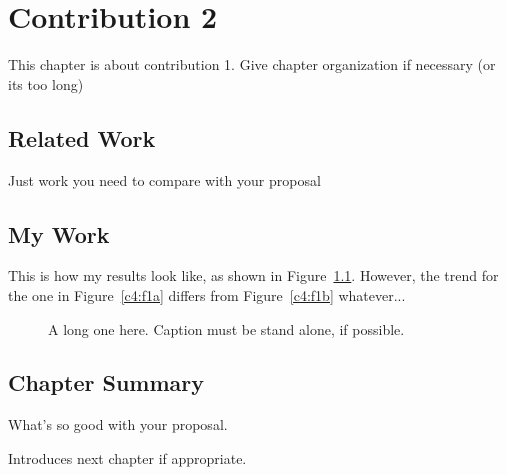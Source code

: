 \chapter{Contribution 2}\label{c4}%
This chapter is about contribution 1. Give chapter organization if
necessary (or its too long)

\section{Related Work}\label{c4:s1}
Just work you need to compare with your proposal

\section{My Work}\label{c4:s2}
This is how my results look like, as shown in Figure~\ref{c4:f1}.
However, the trend for the one in Figure~\ref{c4:f1a} differs from
Figure~\ref{c4:f1b} whatever...

\begin{figure}[!h]
    \centering
    \hfil
    \caption[A short caption here.]{A long one here. Caption must be stand alone, if possible.}\label{c4:f1}
\end{figure}

\section{Chapter Summary}\label{c4:s3}%
What's so good with your proposal.

Introduces next chapter if appropriate.
